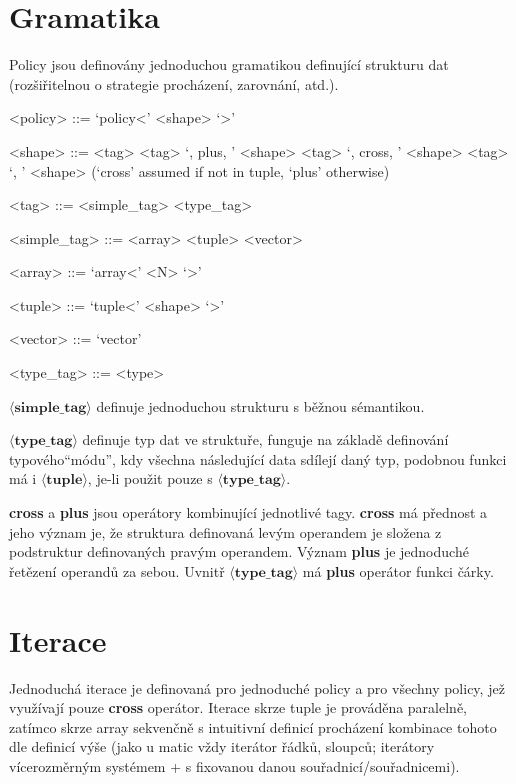 \documentclass[a4paper,12pt]{article}
\begin{document}
    \section{Gramatika}

    Policy jsou definovány jednoduchou gramatikou definující strukturu dat (rozšiřitelnou o strategie procházení, zarovnání, atd.).

    \begin{grammar}
        <policy> ::= `policy<' <shape> `>'

        <shape> ::= <tag>
        \alt <tag> `, plus, ' <shape>
        \alt <tag> `, cross, ' <shape>
        \alt <tag> `, ' <shape> (`cross' assumed if not in tuple, `plus' otherwise)

        <tag> ::= <simple_tag>
        \alt <type_tag>

        <simple_tag> ::= <array>
        \alt <tuple>
        \alt <vector>

        <array> ::= `array<' <N> `>'

        <tuple> ::= `tuple<' <shape> `>'

        <vector> ::= `vector'

        <type_tag> ::= <type>
    \end{grammar}

    $\mathbf{\langle simple\_tag \rangle}$ definuje jednoduchou strukturu s běžnou sémantikou.

    $\mathbf{\langle type\_tag \rangle}$ definuje typ dat ve struktuře, funguje na základě definování typového\linebreak``módu'', kdy všechna následující data sdílejí daný typ, podobnou funkci má i $\mathbf{\langle tuple \rangle}$, je-li použit pouze s $\mathbf{\langle type\_tag \rangle}$.

    \textbf{cross} a \textbf{plus} jsou operátory kombinující jednotlivé tagy.
    \textbf{cross} má přednost a jeho význam je, že struktura definovaná levým operandem je složena z podstruktur definovaných pravým operandem. Význam \textbf{plus} je jednoduché řetězení operandů za sebou. Uvnitř $\mathbf{\langle type\_tag \rangle}$ má \textbf{plus} operátor funkci čárky.

    \section{Iterace}

    Jednoduchá iterace je definovaná pro jednoduché policy a pro všechny policy, jež využívají pouze \textbf{cross} operátor. Iterace skrze tuple je prováděna paralelně, zatímco skrze array sekvenčně s intuitivní definicí procházení kombinace tohoto dle definicí výše (jako u matic vždy iterátor řádků, sloupců; iterátory vícerozměrným systémem + s fixovanou danou souřadnicí/souřadnicemi).
\end{document}
